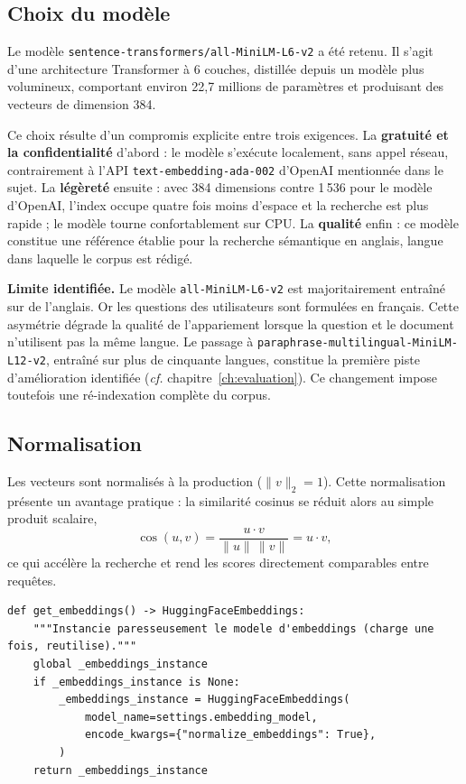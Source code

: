\subsection{Choix du modèle}

Le modèle \texttt{sentence-transformers/all-MiniLM-L6-v2} a été retenu. Il
s'agit d'une architecture Transformer à 6 couches, distillée depuis un modèle
plus volumineux, comportant environ 22,7 millions de paramètres et produisant des
vecteurs de dimension 384.

Ce choix résulte d'un compromis explicite entre trois exigences.
La \textbf{gratuité et la confidentialité} d'abord : le modèle s'exécute
localement, sans appel réseau, contrairement à l'API
\texttt{text-embedding-ada-002} d'OpenAI mentionnée dans le sujet.
La \textbf{légèreté} ensuite : avec 384 dimensions contre 1\,536 pour le modèle
d'OpenAI, l'index occupe quatre fois moins d'espace et la recherche est plus
rapide ; le modèle tourne confortablement sur CPU.
La \textbf{qualité} enfin : ce modèle constitue une référence établie pour la
recherche sémantique en anglais, langue dans laquelle le corpus est rédigé.

\begin{encadre}
\textbf{Limite identifiée.} Le modèle \texttt{all-MiniLM-L6-v2} est
majoritairement entraîné sur de l'anglais. Or les questions des utilisateurs sont
formulées en français. Cette asymétrie dégrade la qualité de l'appariement
lorsque la question et le document n'utilisent pas la même langue. Le passage à
\texttt{paraphrase-multilingual-MiniLM-L12-v2}, entraîné sur plus de cinquante
langues, constitue la première piste d'amélioration identifiée
(\emph{cf.} chapitre~\ref{ch:evaluation}). Ce changement impose toutefois une
ré-indexation complète du corpus.
\end{encadre}

\subsection{Normalisation}

Les vecteurs sont normalisés à la production ($\lVert v \rVert_2 = 1$). Cette
normalisation présente un avantage pratique : la similarité cosinus se réduit
alors au simple produit scalaire,
\[
  \cos(u, v) = \frac{u \cdot v}{\lVert u \rVert\,\lVert v \rVert} = u \cdot v,
\]
ce qui accélère la recherche et rend les scores directement comparables entre
requêtes.

\begin{lstlisting}[style=python,caption={Instanciation du modèle de vectorisation (\texttt{src/ingestion/indexer.py})}]
def get_embeddings() -> HuggingFaceEmbeddings:
    """Instancie paresseusement le modele d'embeddings (charge une fois, reutilise)."""
    global _embeddings_instance
    if _embeddings_instance is None:
        _embeddings_instance = HuggingFaceEmbeddings(
            model_name=settings.embedding_model,
            encode_kwargs={"normalize_embeddings": True},
        )
    return _embeddings_instance
\end{lstlisting}

